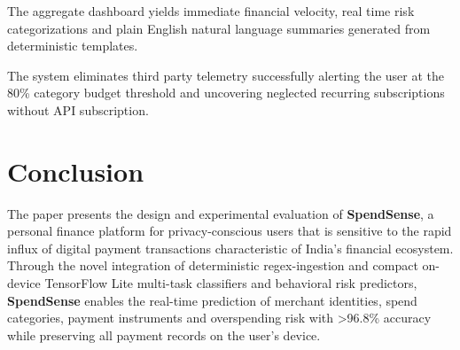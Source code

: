 \documentclass[conference]{IEEEtran}
\begin{document}
The aggregate dashboard yields immediate financial velocity, real time risk categorizations and plain English natural language summaries generated from deterministic templates.

The system eliminates third party telemetry successfully alerting the user at the 80\% category budget threshold and uncovering neglected recurring subscriptions without API subscription.

\section{Conclusion}
The paper presents the design and experimental evaluation of \textbf{SpendSense}, a personal finance platform for privacy-conscious users that is sensitive to the rapid influx of digital payment transactions characteristic of India's financial ecosystem. Through the novel integration of deterministic regex-ingestion and compact on-device TensorFlow Lite multi-task classifiers and behavioral risk predictors, \textbf{SpendSense} enables the real-time prediction of merchant identities, spend categories, payment instruments and overspending risk with >96.8\% accuracy while preserving all payment records on the user's device.
\end{document}
